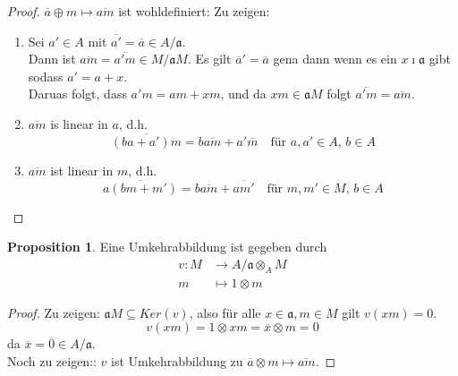 \documentclass[10pt,a4paper]{article}
\newcommand{\ol}[1]{\overline{#1}}
\newcounter{thm}[section]
\theoremstyle{definition}
\newtheorem{prop}[thm]{Proposition}
\theoremstyle{plain}
\theoremstyle{remark}
\begin{document}
\begin{proof}$\ol a\oplus m\mapsto \ol{am}$ ist wohldefiniert:
	Zu zeigen:
	\begin{enumerate}
		\item Sei $a'\in A$ mit $\ol{a'}=\ol a\in A/\mathfrak a$.\\
		Dann ist $\ol{am}=\ol{a'm}\in M/\mathfrak aM$.
		Es gilt $\ol{a}'=\ol a$ gena dann wenn es ein $x\imath\mathfrak a$ gibt sodass $a'=a+x$.\\
		Daruas folgt, dass $a'm=am+xm$, und da $xm\in\mathfrak aM$ folgt $\ol{a'm}=\ol{am}$.
		\item $\ol{am}$ is linear in $a$, d.h.
		\[\ol{(ba+a')m}=b\ol{am}+a'\ol m \quad \text{für $a,a'\in A$, $b\in A$}\]
		\item $\ol{am}$ ist linear in $m$, d.h.
		\[\ol{a(bm+m')}=b\ol{am}+\ol{am'}\quad\text{für $m,m'\in M$, $b\in A$}\]
	\end{enumerate}
\end{proof}
\begin{prop}
	Eine Umkehrabbildung ist gegeben durch
	\begin{align*}
	v:M&\rightarrow A/\mathfrak a\otimes_A M\\
	m&\mapsto 1\otimes m
	\end{align*}
\end{prop}
\begin{proof}
	Zu zeigen: $\mathfrak aM\subseteq Ker(v)$, also für alle $x\in\mathfrak a,m\in M$ gilt $v(xm)=0$.
	\[v(xm)=1\otimes xm=\ol{x}\otimes m=0\]
	da $\ol{x}=\ol{0}\in A/\mathfrak a$.\\
	Noch zu zeigen:: $v$ ist Umkehrabbildung zu $\ol a\otimes m\mapsto \ol{am}$.
\end{proof}
\end{document}
